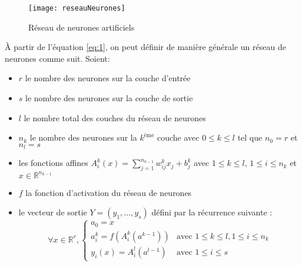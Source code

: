         \begin{figure}
            \centering
            \texttt{[image: reseauNeurones]}
            \caption{Réseau de neurones artificiels}
        \end{figure}
    À partir de l'équation \ref{eq:1}, on peut définir de manière générale un réseau de neurones comme suit. \cite{dahmaneThesis}
    Soient:
        \begin{itemize}
            \item $r$ le nombre des neurones sur la couche d’entrée
            \item $s$ le nombre des neurones sur la couche de sortie
            \item $l$ le nombre total des couches du réseau de neurones
            \item $n_k$ le nombre des neurones sur la $k^\text{ème}$ couche avec $0 \leq k \leq l$ tel que $n_0 = r$ et $n_l = s$
            \item les fonctions affines $A_{i}^{k}(x) = \sum_{j = 1}^{n_{k-1}}w_{ij}^{k}x_{j} + b_{j}^{k}$ avec $1 \leq k \leq l$, $1 \leq i \leq n_k$ et $x \in \mathbb{R}^{n_{k-1}}$
            \item $f$ la fonction d’activation du réseau de neurones
            \item le vecteur de sortie $Y = (y_1, ..., y_s)$ défini par la récurrence suivante : 
            \begin{equation}
                \forall x \in \mathbb{R}^{r}, 
                \begin{cases} 
                    a_{0} = x   \\
                    a_{i}^{k} = f(A_{i}^{k}(a^{k-1}))      & \text{avec } 1 \leq k \leq l, 1 \leq i \leq n_k \\
                    y_{i}(x) = A_{i}^{l}(a^{l-1}) & \text{avec } 1 \leq i \leq s
                \end{cases}
            \end{equation}
        \end{itemize}
